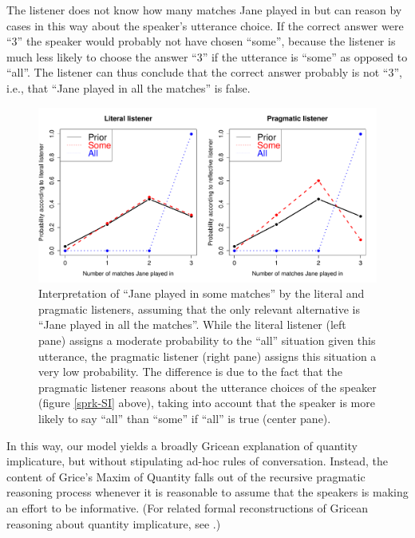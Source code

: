 \documentclass[pdfextras]{handbook}
\begin{document}
The listener does not know how many matches Jane played in but can reason by cases in this way about the speaker's utterance choice. If the correct answer were ``3'' the speaker would probably not have chosen ``some'', because the listener is much less likely to choose the answer ``3'' if the utterance is ``some'' as opposed to ``all''. The listener can thus conclude that the correct answer probably is not ``3'', i.e., that ``Jane played in all the matches'' is false.
\begin{figure}[tbh]
\begin{center}
\includegraphics[scale=.4]{listeners.pdf}
\end{center}
\label{listener-SI}
\caption{Interpretation of ``Jane played in some matches'' by the literal and pragmatic listeners, assuming that the only relevant alternative is ``Jane played in all the matches''. While the literal listener (left pane) assigns a moderate probability to the ``all'' situation given this utterance, the pragmatic listener (right pane) assigns this situation a very low probability. The difference is due to the fact that the pragmatic listener reasons about the utterance choices of the speaker (figure \ref{sprk-SI} above), taking into account that the speaker is more likely to say ``all'' than ``some'' if ``all'' is true (center pane).}
\end{figure}
In this way, our model yields a broadly Gricean explanation of quantity implicature, but without stipulating ad-hoc rules of conversation. Instead, the content of Grice's Maxim of Quantity falls out of the recursive pragmatic reasoning process whenever it is reasonable to assume that the speakers is making an effort to be informative. (For related formal reconstructions of Gricean reasoning about quantity implicature, see \citet{franke09,Vogel-etal:2013}.)
 

\end{document}
